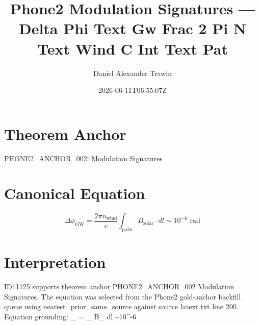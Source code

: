 \documentclass[11pt]{article}
\title{Phone2 Modulation Signatures — Delta Phi Text Gw Frac 2 Pi N Text Wind C Int Text Pat}
\author{Daniel Alexander Trawin}
\date{2026-06-11T06:55:07Z}
\begin{document}
\maketitle
\section*{Theorem Anchor}
PHONE2_ANCHOR_002: Modulation Signatures
\section*{Canonical Equation}
\[
\Delta\phi_{\text{GW}} = \frac{2\pi n_{\text{wind}}}{c} \int_{\text{path}} B_{\text{solar}} \cdot dl \sim 10^{-6} \text{ rad}
\]
\section*{Interpretation}
ID11125 supports theorem anchor PHONE2_ANCHOR_002 Modulation Signatures. The equation was selected from the Phone2 gold-anchor backfill queue using nearest_prior_same_source against source latext.txt line 200. Equation grounding: \Delta\phi_{} =  \int_{} B_{} \cdot dl \sim 10^{-6} 
\end{document}
